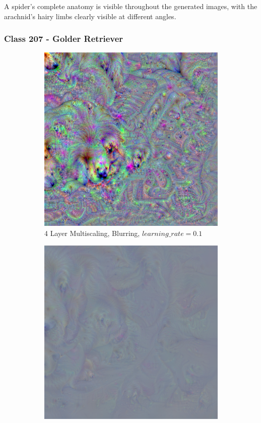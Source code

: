 A spider's complete anatomy is visible throughout the generated images, with the arachnid's hairy limbs clearly visible at different angles.  

\newpage
\subsubsection{Class 207 - Golder Retriever}

\begin{figure}
    \captionsetup{justification=centering}

    \begin{subfigure}[t]{0.31\textwidth}
        \captionsetup{justification=centering}
        \centering
        \includegraphics[width=.7\linewidth]{figuras/feat_vis/experiments/classes/cl207/random_image_ci207_lr1e-1_pl4.png}
        \caption{4 Layer Multiscaling, Blurring, \(learning\_rate = 0.1\)}
    \end{subfigure}
    \hfill
    \begin{subfigure}[t]{0.31\textwidth}
        \captionsetup{justification=centering}
        \centering
        \includegraphics[width=.7\linewidth]{figuras/feat_vis/experiments/classes/cl207/random_image_ci207_lr1e-2_pl6.png}

\end{subfigure}
\end{figure}
